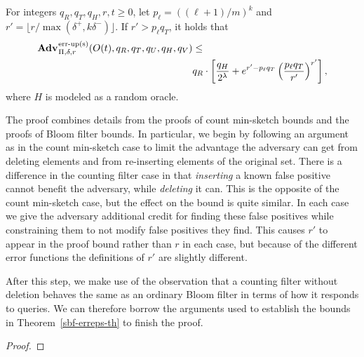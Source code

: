 \begin{theorem}
For integers $q_R, q_T, q_H, r, t \geq 0$, let $p_\ell = ((\ell+1)/m)^k$ and
$r' = \lfloor r/\max(\delta^+,k\delta^-) \rfloor$. If $r' > p_\ell q_T$, it holds that
  \begin{equation*}
  \begin{aligned}
   \Adv{\erreps}_{\Pi,\delta,r}(O(t), q_R,q_T,q_U,q_H,q_V) &\leq\\
     & q_R \cdot \left[\frac{q_H}{2^\lambda} + e^{r'-p_\ell q_T}\left(\frac{p_\ell q_T}{r'}\right)^{r'}\right],
  \end{aligned}
\end{equation*}
where $H$ is modeled as a random oracle.
\end{theorem}
The proof combines details from the proofs of count min-sketch bounds and the
proofs of Bloom filter bounds. In particular, we begin by following an argument
as in the count min-sketch case to limit the advantage the adversary can get
from deleting elements and from re-inserting elements of the original set. There
is a difference in the counting filter case in that \emph{inserting} a known
false positive cannot benefit the adversary, while \emph{deleting} it can. This
is the opposite of the count min-sketch case, but the effect on the bound is
quite similar. In each case we give the adversary additional credit for finding
these false positives while constraining them to not modify false positives they
find. This causes $r'$ to appear in the proof bound rather than $r$ in each
case, but because of the different error functions the definitions of $r'$ are
slightly different.

After this step, we make use of the observation that a counting filter without
deletion behaves the same as an ordinary Bloom filter in terms of how it
responds to queries. We can therefore borrow the arguments used to establish the
bounds in Theorem~\ref{sbf-erreps-th} to finish the proof.
\begin{proof}
  
\end{proof}

